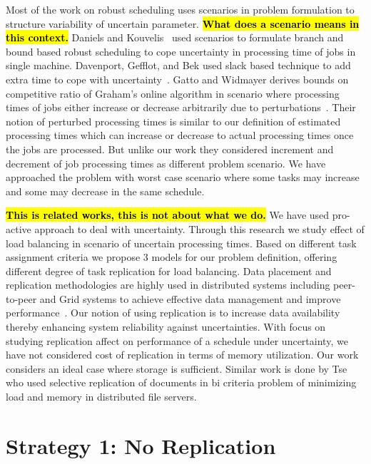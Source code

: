\documentclass[10pt, conference, compsocconf]{IEEEtran}
\newcommand{\todo}[1]{{\color{red}\textbf{\hl{#1}}\xspace}}
\begin{document}
Most of the work on robust scheduling uses scenarios in problem
formulation to structure variability of uncertain parameter. \todo{What does a scenario means in this context.} Daniels and Kouvelis~\cite{citeulike:8334169} used scenarios to formulate
branch and bound based robust scheduling to cope uncertainty in
processing time of jobs in single machine. Davenport, Gefflot, and Bek
used slack based technique to add extra time to cope with
uncertainty~\cite{Davenport_slack-basedtechniques}. Gatto and Widmayer
derives bounds on competitive ratio of Graham’s online algorithm in
scenario where processing times of jobs either increase or decrease
arbitrarily due to perturbations~\cite{Gatto07}.  Their notion of
perturbed processing times is similar to our definition of estimated
processing times which can increase or decrease to actual processing
times once the jobs are processed. But unlike our work they considered
increment and decrement of job processing times as different problem
scenario. We have approached the problem with worst case scenario
where some tasks may increase and some may decrease in the same
schedule.
  
\todo{This is related works, this is not about what we do.} We have
used pro-active approach to deal with uncertainty. Through this
research we study effect of load balancing in scenario of uncertain
processing times. Based on different task assignment criteria we
propose 3 models for our problem definition, offering different degree
of task replication for load balancing. Data placement and replication
methodologies are highly used in distributed systems including
peer-to-peer and Grid systems to achieve effective data management and
improve
performance~\cite{Cirne2007213}\cite{Abawajy}\cite{4215379}. Our
notion of using replication is to increase data availability thereby
enhancing system reliability against uncertainties. With focus on
studying replication affect on performance of a schedule under
uncertainty, we have not considered cost of replication in terms of
memory utilization. Our work considers an ideal case where storage is
sufficient.  Similar work is done by Tse~\cite{DBLP:journals/tc/Tse12}
who used selective replication of documents in bi criteria problem of
minimizing load and memory in distributed file servers.

\section{Strategy 1: No Replication}\label{sec4}
\end{document}
